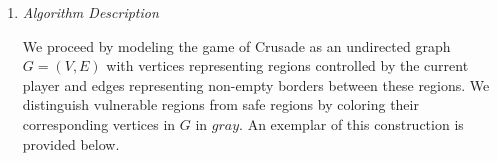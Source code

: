 \documentclass[10pt, letterpaper]{article}
\begin{document}
\begin{enumerate}[label={\bfseries Q\arabic*.}]
    \vspace*{\baselineskip}
    {\itshape Algorithm Pseudocode} \par \vspace{-4mm}
    \begin{minipage}{\linewidth}
      \begin{algorithm}[H]
        \caption{\textsc{Minimum-Spanning-Tree}$(G \gets (V, E))$}\label{alg:reverse-delete}
        \begin{algorithmic}[1]
          \State $T \gets \textsc{Reverse-Sort-By-Weight}(E)$
              \State $T \gets T \setminus \{e\}$
            \EndIf
          \EndFor
          \State \Return $T$
        \end{algorithmic}
      \end{algorithm}
    \end{minipage}

    \vspace*{\baselineskip}
    {\itshape Time Analysis} \par
    The implementation of \autoref{alg:reverse-delete} begins by sorting the edges in $O(E
    \log E)$ time. For each edge we check whether $T \setminus \{e\}$ is connected and we do
    so via DFS. Each call to DFS takes $O(V+E)$, and doing for all entries of $E$ takes $O(
    E(V+E))$. Since $G$ is connected, $E$ dominates $V$ asymptotically, so the total running
    time is $O(E^2)$.

  \item
    {\itshape Algorithm Description} \par
    We proceed by modeling the game of Crusade as an undirected graph $G = (V, E)$ with
    vertices representing regions controlled by the current player and edges representing non-empty
    borders between these regions. We distinguish vulnerable regions from safe regions by coloring
    their corresponding vertices in $G$ in $gray$. An exemplar of this construction is provided below.


\end{enumerate}
\end{document}
